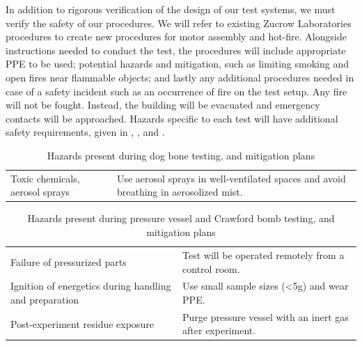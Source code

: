 In addition to rigorous verification of the design of our test systems, we must verify the safety of our procedures. We will refer to existing Zucrow Laboratories procedures to create new procedures for motor assembly and hot-fire. Alongside instructions needed to conduct the test, the procedures will include appropriate PPE to be used; potential hazards and mitigation, such as limiting smoking and open fires near flammable objects; and lastly any additional procedures needed in case of a safety incident such as an occurrence of fire on the test setup. Any fire will not be fought. Instead, the building will be evacuated and emergency contacts will be approached. Hazards specific to each test will have additional safety requirements, given in , , and .

\begin{table}
    \centering

    \begin{longtable}{|>{\raggedright\arraybackslash}p{5.75cm}|>{\raggedright\arraybackslash}p{8.75cm}|}
        \hline
        \multicolumn{1}{|c|}{\textbf{Hazard}} & \multicolumn{1}{c|}{\textbf{Mitigation}} \\ \hline
        Toxic chemicals, aerosol sprays & Use aerosol sprays in well-ventilated spaces and avoid breathing in aerosolized mist. \\ \hline
    \end{longtable}

    \vspace{0.2cm}
    
    \caption{Hazards present during dog bone testing, and mitigation plans}
    \label{table:dogbone-hazards}
\end{table}

\begin{table}
    \centering

    \begin{longtable}{|>{\raggedright\arraybackslash}p{5.75cm}|>{\raggedright\arraybackslash}p{8.75cm}|}
        \hline
        \multicolumn{1}{|c|}{\textbf{Hazard}} & \multicolumn{1}{c|}{\textbf{Mitigation}} \\ \hline
        Failure of pressurized parts & Test will be operated remotely from a control room. \\ \hline
        Ignition of energetics during handling and preparation & Use small sample sizes (<5g) and wear PPE. \\ \hline
        Post-experiment residue exposure & Purge pressure vessel with an inert gas after experiment. \\ \hline
    \end{longtable}

    \vspace{0.2cm}
    
    \caption{Hazards present during pressure vessel and Crawford bomb testing, and mitigation plans}
    \label{table:bomb-hazards}
\end{table}

